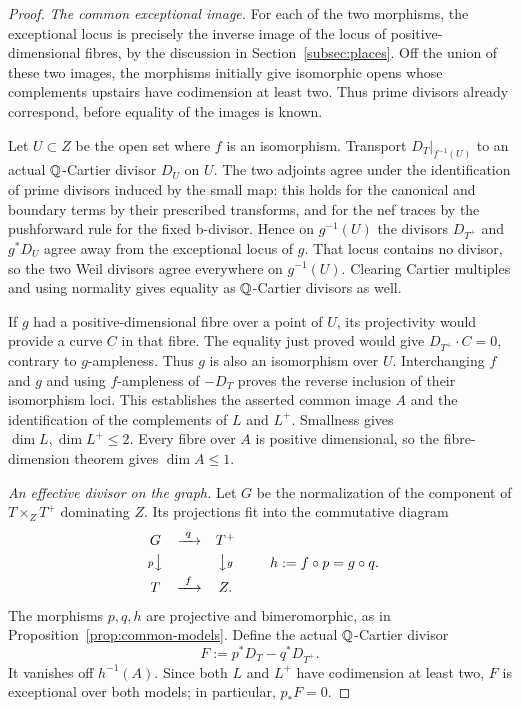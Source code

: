 \begin{proof}
\emph{The common exceptional image.}
For each of the two morphisms, the exceptional locus is precisely the
inverse image of the locus of positive-dimensional fibres, by the
discussion in Section~\ref{subsec:places}. Off the union of these
two images, the morphisms initially give isomorphic opens whose
complements upstairs have codimension at least two. Thus prime
divisors already correspond, before equality of the images is known.

Let $U\subset Z$ be the open set where $f$ is an isomorphism.  Transport
$D_T|_{f^{-1}(U)}$ to an actual $\mathbb Q$-Cartier divisor $D_U$ on $U$.
The two adjoints agree under the identification of prime divisors
induced by the small map: this holds for the canonical and boundary
terms by their prescribed transforms, and for the nef traces by the
pushforward rule for the fixed b-divisor.  Hence on $g^{-1}(U)$ the
divisors $D_{T^+}$ and $g^*D_U$ agree away from the exceptional locus
of $g$.  That locus contains no divisor, so the two Weil divisors
agree everywhere on $g^{-1}(U)$.  Clearing Cartier multiples and using
normality gives equality as $\mathbb Q$-Cartier divisors as well.

If $g$ had a positive-dimensional fibre over a point of $U$, its
projectivity would provide a curve $C$ in that fibre.  The equality
just proved would give $D_{T^+}\cdot C=0$, contrary to $g$-ampleness.
Thus $g$ is also an isomorphism over $U$.  Interchanging $f$ and $g$
and using $f$-ampleness of $-D_T$ proves the reverse inclusion of their
isomorphism loci.  This establishes the asserted common image $A$
and the identification of the complements of $L$ and $L^+$.
Smallness gives $\dim L,\dim L^+\leq2$.  Every fibre over $A$ is
positive dimensional, so the fibre-dimension theorem gives
$\dim A\leq1$.

\emph{An effective divisor on the graph.}
Let $G$ be the normalization of the component of $T\times_ZT^+$
dominating $Z$.  Its projections fit into the commutative diagram
\begin{equation}\label{eq:normalized-graph}
 \begin{array}{ccc}
 G&\xrightarrow{\ q\ }&T^+\\[3pt]
 {\scriptstyle p}\big\downarrow&&
                  \big\downarrow{\scriptstyle g}\\[3pt]
 T&\xrightarrow{\ f\ }&Z.
 \end{array}
 \qquad h:=f\circ p=g\circ q.
\end{equation}
The morphisms $p,q,h$ are projective and bimeromorphic, as in
Proposition~\ref{prop:common-models}.  Define the actual $\mathbb Q$-Cartier
divisor
\begin{equation}\label{eq:graph-divisor}
 F:=p^*D_T-q^*D_{T^+}.
\end{equation}
It vanishes off $h^{-1}(A)$.  Since both $L$ and $L^+$ have codimension
at least two, $F$ is exceptional over both models; in particular,
$p_*F=0$.


\end{proof}
